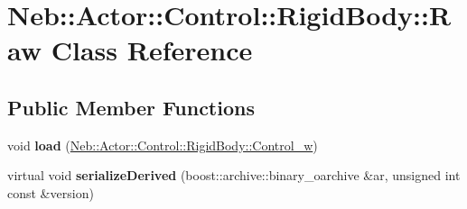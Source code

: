 \hypertarget{classNeb_1_1Actor_1_1Control_1_1RigidBody_1_1Raw}{\section{\-Neb\-:\-:\-Actor\-:\-:\-Control\-:\-:\-Rigid\-Body\-:\-:\-Raw \-Class \-Reference}
\label{classNeb_1_1Actor_1_1Control_1_1RigidBody_1_1Raw}
}
\subsection*{\-Public \-Member \-Functions}
\begin{DoxyCompactItemize}
\item 
\hypertarget{classNeb_1_1Actor_1_1Control_1_1RigidBody_1_1Raw_a50e97ae889581d1ae6470eb2665c1ecc}{void {\bfseries load} (\hyperlink{classNeb_1_1weak__ptr}{\-Neb\-::\-Actor\-::\-Control\-::\-Rigid\-Body\-::\-Control\-\_\-w})}\label{classNeb_1_1Actor_1_1Control_1_1RigidBody_1_1Raw_a50e97ae889581d1ae6470eb2665c1ecc}

\item 
\hypertarget{classNeb_1_1Actor_1_1Control_1_1RigidBody_1_1Raw_aaf1dafa5a362834162ab2eb19e174e1a}{virtual void {\bfseries serialize\-Derived} (boost\-::archive\-::binary\-\_\-oarchive \&ar, unsigned int const \&version)}\label{classNeb_1_1Actor_1_1Control_1_1RigidBody_1_1Raw_aaf1dafa5a362834162ab2eb19e174e1a}

\end{DoxyCompactItemize}

